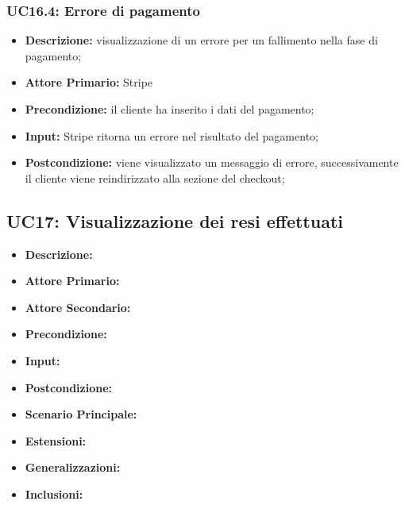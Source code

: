             \subsubsection{UC16.4: Errore di pagamento}
                \begin{itemize}
                    \item \textbf{Descrizione:} visualizzazione di un errore per un fallimento nella fase di pagamento;
                    \item \textbf{Attore Primario:} Stripe
                    \item \textbf{Precondizione:} il cliente ha inserito i dati del pagamento;
                    \item \textbf{Input:} Stripe ritorna un errore nel risultato del pagamento;
                    \item \textbf{Postcondizione:} viene visualizzato un messaggio di errore, successivamente il cliente viene reindirizzato alla sezione del checkout;
                \end{itemize}

        \subsection{UC17: Visualizzazione dei resi effettuati}
            \begin{itemize}
                \item \textbf{Descrizione:}
                \item \textbf{Attore Primario:}
                \item \textbf{Attore Secondario:}
                \item \textbf{Precondizione:}
                \item \textbf{Input:}
                \item \textbf{Postcondizione:}
                \item \textbf{Scenario Principale:}
                \item \textbf{Estensioni:}
                \item \textbf{Generalizzazioni:}
                \item \textbf{Inclusioni:}
            \end{itemize}
